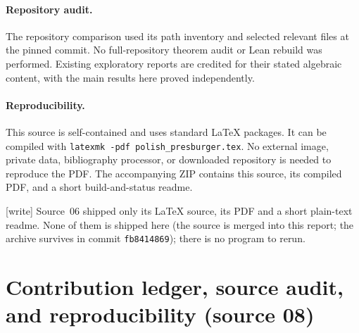 \documentclass[11pt]{article}
\numberwithin{equation}{section}
\theoremstyle{definition}
\theoremstyle{remark}
\newcommand{\writetag}{\textup{\textsf{\small[write]}}}
\begin{document}
\paragraph{Repository audit.}
The repository comparison used its path inventory and selected
relevant files at the pinned commit. No full-repository theorem
audit or Lean rebuild was performed. Existing exploratory reports
are credited for their stated algebraic content, with the main
results here proved independently.

\paragraph{Reproducibility.}
This source is self-contained and uses standard \LaTeX{} packages.
It can be compiled with
\texttt{latexmk -pdf polish\_presburger.tex}.
No external image, private data, bibliography processor, or downloaded
repository is needed to reproduce the PDF. The accompanying ZIP
contains this source, its compiled PDF, and a short build-and-status
readme.

\noindent\writetag{} Source~06 shipped only its \LaTeX{} source, its PDF and
a short plain-text readme. None of them is shipped here (the source is merged
into this report; the archive survives in commit \texttt{fb8414869}); there is
no program to rerun.

\section{Contribution ledger, source audit, and reproducibility (source 08)}
\label{pma:lc:app:audit}
\end{document}
